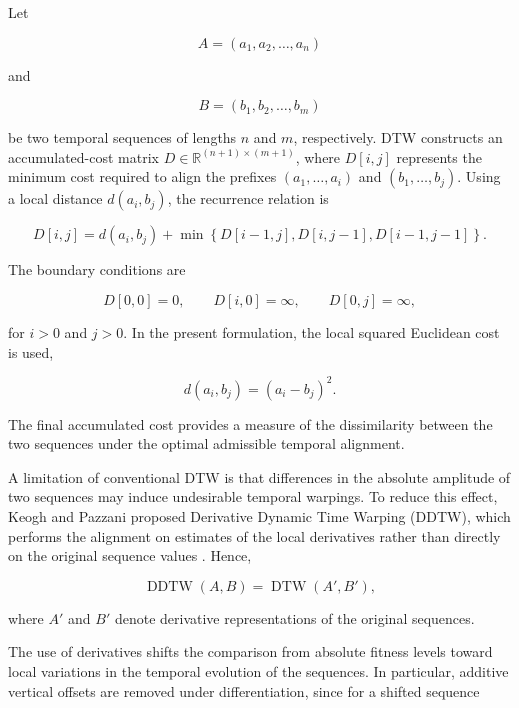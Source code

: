 \documentclass[journal,article,submit,moreauthors]{Definitions/mdpi}
\begin{document}
Let

\begin{equation}
A = (a_1,a_2,\ldots,a_n)
\end{equation}

and

\begin{equation}
B = (b_1,b_2,\ldots,b_m)
\end{equation}

be two temporal sequences of lengths $n$ and $m$, respectively. DTW constructs
an accumulated-cost matrix $D \in \mathbb{R}^{(n+1)\times(m+1)}$, where
$D[i,j]$ represents the minimum cost required to align the prefixes
$(a_1,\ldots,a_i)$ and $(b_1,\ldots,b_j)$. Using a local distance
$d(a_i,b_j)$, the recurrence relation is

\begin{equation}
D[i,j] =
d(a_i,b_j)
+
\min
\left\{
D[i-1,j],
D[i,j-1],
D[i-1,j-1]
\right\}.
\end{equation}

The boundary conditions are

\begin{equation}
D[0,0]=0,
\qquad
D[i,0]=\infty,
\qquad
D[0,j]=\infty,
\end{equation}

for $i>0$ and $j>0$. In the present formulation, the local squared
Euclidean cost is used,

\begin{equation}
d(a_i,b_j)=(a_i-b_j)^2.
\end{equation}

The final accumulated cost provides a measure of the dissimilarity between
the two sequences under the optimal admissible temporal alignment.

A limitation of conventional DTW is that differences in the absolute
amplitude of two sequences may induce undesirable temporal warpings. To
reduce this effect, Keogh and Pazzani proposed Derivative Dynamic Time
Warping (DDTW), which performs the alignment on estimates of the local
derivatives rather than directly on the original sequence values
\cite{keogh2001derivative}. Hence,

\begin{equation}
\operatorname{DDTW}(A,B)
=
\operatorname{DTW}(A',B'),
\end{equation}

where $A'$ and $B'$ denote derivative representations of the original
sequences.

The use of derivatives shifts the comparison from absolute fitness levels
toward local variations in the temporal evolution of the sequences. In
particular, additive vertical offsets are removed under differentiation,
since for a shifted sequence
\end{document}
